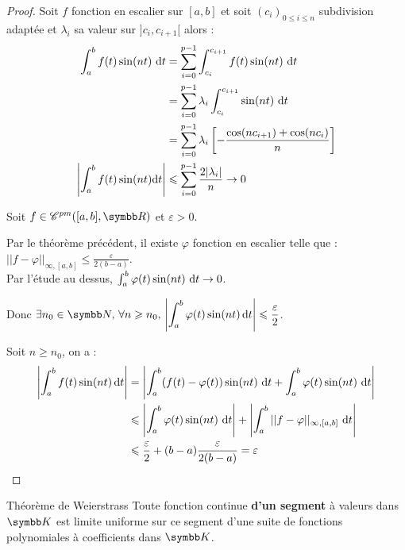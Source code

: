 \begin{proof}
    Soit $f$ fonction en escalier sur $[a, b]$ et soit $(c_i)_{0 \leqslant i \leqslant n}$ 
    subdivision adaptée et $\lambda_i$ sa valeur sur $]c_i, c_{i + 1}[$ alors :
    \begin{align*}
        \int_{a }^{b } f(t) \sin(nt) \,\,\mathrm{d}t & = \sum_{i = 0}^{p - 1} \int_{c_i}^{c_{i + 1}} f(t) \sin(nt) \,\,\mathrm{d}t \\
        & = \sum_{i = 0}^{p - 1} \lambda_i \int_{c_i}^{c_{i + 1}} \sin(nt) \,\,\mathrm{d}t \\
        & = \sum_{i = 0}^{p - 1} \lambda_i \left[ - \frac{\cos(nc_{i + 1}) + \cos(nc_i)}{n} \right] \\
        \left| \int_a^b f(t) \sin(nt) \mathrm d t  \right| & \leqslant \sum_{i = 0 }^{p - 1} \frac{2 |\lambda_i|}{n} \to 0
    \end{align*}

    Soit $f \in \mathscr C^{pm}([a, b], \R)$ et $\varepsilon > 0$.

    Par le théorème précédent, il existe $\varphi$ fonction en escalier telle que :
    $||f - \varphi||_{\infty, [a, b]} \leqslant \frac \varepsilon {2 (b - a)}$. \\
    Par l'étude au dessus, $\int_a^b \varphi(t) \sin(nt) \,\,\mathrm{d}t \to 0$.

    Donc $\ds \exists n_0 \in \N, \, \forall n \geqslant n_0, \, \left| \int_a^b \varphi(t) \sin(nt) \,\mathrm{d}t \right| \leqslant \frac \varepsilon 2$.

    Soit $n \geqslant n_0$, on a :
    \begin{align*}
        \left| \int_a^b f(t) \sin(nt) \,\mathrm{d}t  \right| & = \left| \int_a^b (f(t) - \varphi(t)) \sin(nt) \,\,\mathrm{d}t + \int_a^b \varphi(t) \sin(nt) \,\,\mathrm{d}t \right| \\
        & \leqslant \left| \int_a^b \varphi(t) \sin(nt) \,\,\mathrm{d}t \right| + \left| \int_a^b ||f - \varphi||_{\infty, [a, b]} \,\,\mathrm{d}t \right| \\
        & \leqslant \frac \varepsilon 2 + (b - a) \frac \varepsilon {2 (b - a)} = \varepsilon
    \end{align*}
\end{proof}

\begin{theoreme}{Théorème de Weierstrass}{}
    Toute fonction continue \textbf{d'un segment} à valeurs dans $\K$ est limite uniforme sur ce segment 
    d'une suite de fonctions polynomiales à coefficients dans $\K$.
\end{theoreme}

